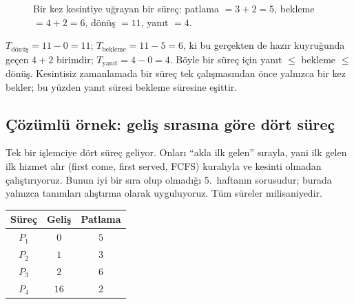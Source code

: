 \begin{figure}[H]
\centering
{}
\caption{Bir kez kesintiye uğrayan bir süreç: patlama $=3+2=5$, bekleme $=4+2=6$, dönüş $=11$, yanıt $=4$.}
\end{figure}

\begin{example}
$T_{\text{dönüş}} = 11 - 0 = 11$; $T_{\text{bekleme}} = 11 - 5 = 6$, ki bu gerçekten de hazır kuyruğunda geçen $4 + 2$ birimdir; $T_{\text{yanıt}} = 4 - 0 = 4$. Böyle bir süreç için yanıt $\le$ bekleme $\le$ dönüş. Kesintisiz zamanlamada bir süreç tek çalışmasından önce yalnızca bir kez bekler; bu yüzden yanıt süresi bekleme süresine eşittir.
\end{example}

\subsection{Çözümlü örnek: geliş sırasına göre dört süreç}

Tek bir işlemciye dört süreç geliyor. Onları ``akla ilk gelen'' sırayla, yani ilk gelen ilk hizmet alır (first come, first served, FCFS) kuralıyla ve kesinti olmadan çalıştırıyoruz. Bunun iyi bir sıra olup olmadığı 5.~haftanın sorusudur; burada yalnızca tanımları alıştırma olarak uyguluyoruz. Tüm süreler milisaniyedir.

\begin{center}
\renewcommand{\arraystretch}{1.2}
\begin{tabular}{@{}ccc@{}}
\toprule
\textbf{Süreç} & \textbf{Geliş} & \textbf{Patlama} \\
\midrule
$P_1$ & $0$ & $5$ \\
$P_2$ & $1$ & $3$ \\
$P_3$ & $2$ & $6$ \\
$P_4$ & $16$ & $2$ \\
\bottomrule
\end{tabular}
\end{center}

